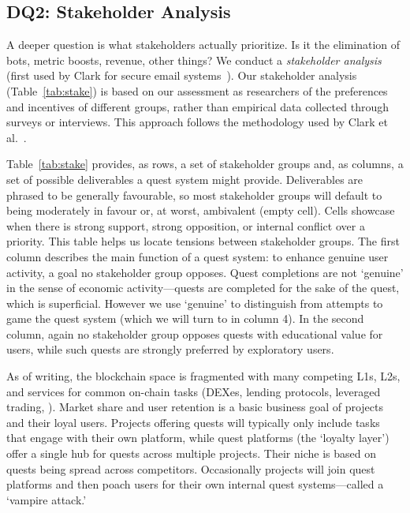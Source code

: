 
\subsection{DQ2: Stakeholder Analysis} 



A deeper question is what stakeholders actually prioritize. Is it the elimination of bots, metric boosts, revenue, other things? We conduct a \textit{stakeholder analysis} (first used by Clark \etal for secure email systems~\cite{CvORSZ21}). Our stakeholder analysis (Table~\ref{tab:stake}) is based on our assessment as researchers of the preferences and incentives of different groups, rather than empirical data collected through surveys or interviews. This approach follows the methodology used by Clark et al.~\cite{CvORSZ21}.

Table~\ref{tab:stake} provides, as rows, a set of stakeholder groups and, as columns, a set of possible deliverables a quest system might provide. Deliverables are phrased to be generally favourable, so most stakeholder groups will default to being moderately in favour or, at worst, ambivalent (empty cell). Cells showcase when there is strong support, strong opposition, or internal conflict over a priority. This table helps us locate tensions between stakeholder groups. 
The first column describes the main function of a quest system: to enhance genuine user activity, a goal no stakeholder group opposes. Quest completions are not `genuine' in the sense of economic activity---quests are completed for the sake of the quest, which is superficial. However we use `genuine' to distinguish from attempts to game the quest system (which we will turn to in column 4). In the second column, again no stakeholder group opposes quests with educational value for users, while such quests are strongly preferred by exploratory users.

As of writing, the blockchain space is fragmented with many competing L1s, L2s, and services for common on-chain tasks (\eg DEXes, lending protocols, leveraged trading, \etc). Market share and user retention is a basic business goal of projects and their loyal users. Projects offering quests will typically only include tasks that engage with their own platform, while quest platforms (the `loyalty layer') offer a single hub for quests across multiple projects. Their niche is based on quests being spread across competitors. Occasionally projects will join quest platforms and then poach users for their own internal quest systems---called a `vampire attack.'

